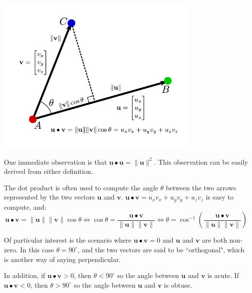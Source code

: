 \documentclass{article}
\begin{document}
\begin{center}
\includegraphics[width = 0.75\textwidth]{displacement_vector_dot_product}
\end{center}

One immediate observation is that \(\mathbf{u} \bullet \mathbf{u} = \|\mathbf{u}\|^2\). This observation can be easily derived from either definition.

The dot product is often used to compute the angle \(\theta\) between the two arrows represented by the two vectors \(\mathbf{u}\) and \(\mathbf{v}\). \(\mathbf{u} \bullet \mathbf{v} = u_x v_x + u_y v_y + u_z v_z\) is easy to compute, and:
\[\mathbf{u} \bullet \mathbf{v} = \|\mathbf{u}\|\|\mathbf{v}\|\cos\theta \iff \cos\theta = \frac{\mathbf{u} \bullet \mathbf{v}}{\|\mathbf{u}\| \|\mathbf{v}\|} \iff \theta = \cos^{-1}\left(\frac{\mathbf{u} \bullet \mathbf{v}}{\|\mathbf{u}\| \|\mathbf{v}\|}\right)\] 

Of particular interest is the scenario where \(\mathbf{u} \bullet \mathbf{v} = 0\) and \(\mathbf{u}\) and \(\mathbf{v}\) are both non-zero. In this case \(\theta = 90^\circ\), and the two vectors are said to be ``orthogonal", which is another way of saying perpendicular.

In addition, if \(\mathbf{u} \bullet \mathbf{v} > 0\), then \(\theta < 90^\circ\) so the angle between \(\mathbf{u}\) and \(\mathbf{v}\) is acute. If \(\mathbf{u} \bullet \mathbf{v} < 0\), then \(\theta > 90^\circ\) so the angle between \(\mathbf{u}\) and \(\mathbf{v}\) is obtuse.
\end{document}
